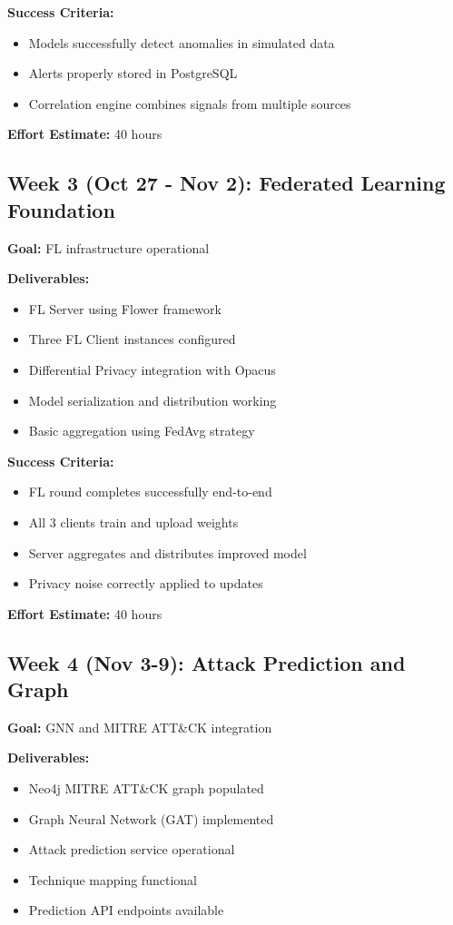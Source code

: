 \documentclass[12pt,a4paper]{article}
\begin{document}
\textbf{Success Criteria:}
\begin{itemize}[leftmargin=1cm,itemsep=0pt]
    \item Models successfully detect anomalies in simulated data
    \item Alerts properly stored in PostgreSQL
    \item Correlation engine combines signals from multiple sources
\end{itemize}

\textbf{Effort Estimate:} 40 hours

\subsection{Week 3 (Oct 27 - Nov 2): Federated Learning Foundation}

\textbf{Goal:} FL infrastructure operational

\textbf{Deliverables:}
\begin{itemize}[leftmargin=1cm,itemsep=0pt]
    \item FL Server using Flower framework
    \item Three FL Client instances configured
    \item Differential Privacy integration with Opacus
    \item Model serialization and distribution working
    \item Basic aggregation using FedAvg strategy
\end{itemize}

\textbf{Success Criteria:}
\begin{itemize}[leftmargin=1cm,itemsep=0pt]
    \item FL round completes successfully end-to-end
    \item All 3 clients train and upload weights
    \item Server aggregates and distributes improved model
    \item Privacy noise correctly applied to updates
\end{itemize}

\textbf{Effort Estimate:} 40 hours

\subsection{Week 4 (Nov 3-9): Attack Prediction and Graph}

\textbf{Goal:} GNN and MITRE ATT\&CK integration

\textbf{Deliverables:}
\begin{itemize}[leftmargin=1cm,itemsep=0pt]
    \item Neo4j MITRE ATT\&CK graph populated
    \item Graph Neural Network (GAT) implemented
    \item Attack prediction service operational
    \item Technique mapping functional
    \item Prediction API endpoints available
\end{itemize}
\end{document}
